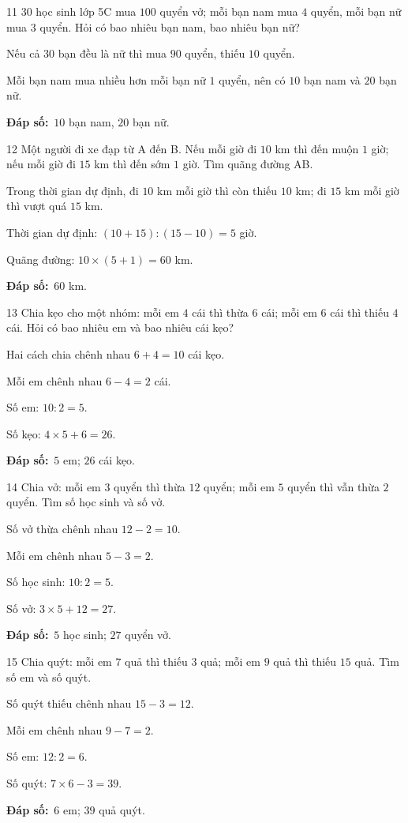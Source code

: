 \documentclass[11pt]{article}
\newif\ifsol \solfalse
\providecommand{\AnsWord}{Đáp số}
\newcommand{\dapso}[1]{\par\textbf{\AnsWord:}\ #1}
\newcommand{\probsol}[1]{%
  \begin{lrbox}{\solmeasure}\begin{minipage}{\dimexpr\linewidth-24pt\relax}#1\end{minipage}\end{lrbox}%
  \ifsol
    \begin{solbox}#1\end{solbox}%
  \else
    \setlength{\solht}{\dimexpr\ht\solmeasure+\dp\solmeasure+0.85cm\relax}%
    \ifdim\solht<1.35cm\setlength{\solht}{1.35cm}\fi
    \begin{tcolorbox}[colback=white,colframe=Line,boxrule=0.8pt,arc=5pt,
      left=8pt,right=8pt,top=4pt,bottom=4pt,height=\solht]{\footnotesize\color{Slate}\itshape\WorkWord}\end{tcolorbox}%
  \fi}
\newcommand{\gap}{\vspace{0.3cm}}
\def\WorkWord{Bài làm:}
\def\AnsWord{Đáp số}
\begin{document}
\gap
\begin{probbox}{11}{\relax}
$30$ học sinh lớp 5C mua $100$ quyển vở; mỗi bạn nam mua $4$ quyển, mỗi bạn nữ mua $3$ quyển. Hỏi có bao nhiêu bạn nam, bao nhiêu bạn nữ?
\end{probbox}
\probsol{
Nếu cả $30$ bạn đều là nữ thì mua $90$ quyển, thiếu $10$ quyển.\par Mỗi bạn nam mua nhiều hơn mỗi bạn nữ $1$ quyển, nên có $10$ bạn nam và $20$ bạn nữ.
\dapso{$10$ bạn nam, $20$ bạn nữ.}}
\gap
\begin{probbox}{12}{\relax}
Một người đi xe đạp từ A đến B. Nếu mỗi giờ đi $10$ km thì đến muộn $1$ giờ; nếu mỗi giờ đi $15$ km thì đến sớm $1$ giờ. Tìm quãng đường AB.
\end{probbox}
\probsol{
Trong thời gian dự định, đi $10$ km mỗi giờ thì còn thiếu $10$ km; đi $15$ km mỗi giờ thì vượt quá $15$ km.\par Thời gian dự định: $(10+15):(15-10)=5$ giờ.\par
Quãng đường: $10\times(5+1)=60$ km.
\dapso{$60$ km.}}
\gap
\begin{probbox}{13}{\relax}
Chia kẹo cho một nhóm: mỗi em $4$ cái thì thừa $6$ cái; mỗi em $6$ cái thì thiếu $4$ cái. Hỏi có bao nhiêu em và bao nhiêu cái kẹo?
\end{probbox}
\probsol{
Hai cách chia chênh nhau $6+4=10$ cái kẹo.\par Mỗi em chênh nhau $6-4=2$ cái.\par Số em: $10:2=5$.\par Số kẹo: $4\times5+6=26$.
\dapso{$5$ em; $26$ cái kẹo.}}
\gap
\begin{probbox}{14}{\relax}
Chia vở: mỗi em $3$ quyển thì thừa $12$ quyển; mỗi em $5$ quyển thì vẫn thừa $2$ quyển. Tìm số học sinh và số vở.
\end{probbox}
\probsol{
Số vở thừa chênh nhau $12-2=10$.\par Mỗi em chênh nhau $5-3=2$.\par Số học sinh: $10:2=5$.\par Số vở: $3\times5+12=27$.
\dapso{$5$ học sinh; $27$ quyển vở.}}
\gap
\begin{probbox}{15}{\relax}
Chia quýt: mỗi em $7$ quả thì thiếu $3$ quả; mỗi em $9$ quả thì thiếu $15$ quả. Tìm số em và số quýt.
\end{probbox}
\probsol{
Số quýt thiếu chênh nhau $15-3=12$.\par Mỗi em chênh nhau $9-7=2$.\par Số em: $12:2=6$.\par Số quýt: $7\times6-3=39$.
\dapso{$6$ em; $39$ quả quýt.}}
\end{document}
